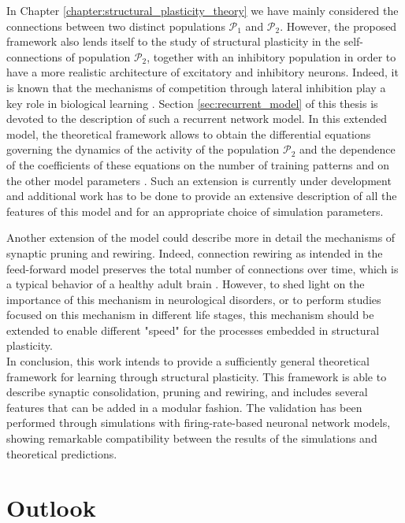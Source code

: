 \documentclass[a4paper, 12pt, twoside, openright]{book}
\newcommand{\popI}{\mathcal{P}_1}
\newcommand{\popII}{\mathcal{P}_2}
\begin{document}
In Chapter \ref{chapter:structural_plasticity_theory} we have mainly considered the connections between two distinct populations $\popI$ and $\popII$. However, the proposed framework also lends itself to the study of structural plasticity in the self-connections of population $\popII$, together with an inhibitory population in order to have a more realistic architecture of excitatory and inhibitory neurons. Indeed, it is known that the mechanisms of competition through lateral inhibition play a key role in biological learning \cite{Coultrip1992}. Section \ref{sec:recurrent_model} of this thesis is devoted to the description of such a recurrent network model. In this extended model, the theoretical framework allows to obtain the differential equations governing the dynamics of the activity of the population $\popII$ and the dependence of the coefficients of these equations on the number of training patterns and on the other model parameters \cite{Sergi2023}. Such an extension is currently under development and additional work has to be done to provide an extensive description of all the features of this model and for an appropriate choice of simulation parameters.


Another extension of the model could describe more in detail the mechanisms of synaptic pruning and rewiring. Indeed, connection rewiring as intended in the feed-forward model preserves the total number of connections over time, which is a typical behavior of a healthy adult brain \cite{Huttenlocher1979}. However, to shed light on the importance of this mechanism in neurological disorders, or to perform studies focused on this mechanism in different life stages, this mechanism should be extended to enable different "speed" for the processes embedded in structural plasticity.\\


In conclusion, this work intends to provide a sufficiently general theoretical framework for learning through structural plasticity. This framework is able to describe synaptic consolidation, pruning and rewiring, and includes several features that can be added in a modular fashion.
The validation has been performed through simulations with firing-rate-based neuronal network models, showing remarkable compatibility between the results of the simulations and theoretical predictions.


\section*{Outlook}
\end{document}
